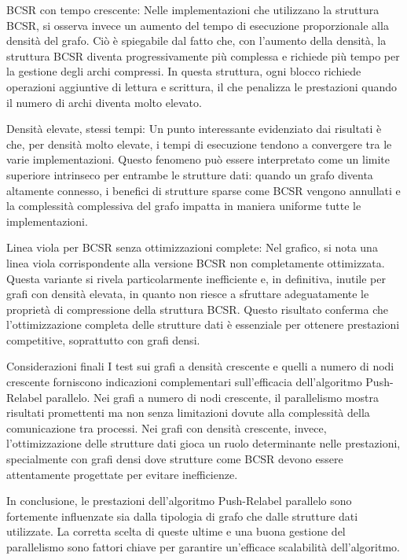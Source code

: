 BCSR con tempo crescente: Nelle implementazioni che utilizzano la struttura BCSR, si osserva invece un aumento del tempo di esecuzione proporzionale alla densità del grafo. Ciò è spiegabile dal fatto che, con l'aumento della densità, la struttura BCSR diventa progressivamente più complessa e richiede più tempo per la gestione degli archi compressi. In questa struttura, ogni blocco richiede operazioni aggiuntive di lettura e scrittura, il che penalizza le prestazioni quando il numero di archi diventa molto elevato.

Densità elevate, stessi tempi: Un punto interessante evidenziato dai risultati è che, per densità molto elevate, i tempi di esecuzione tendono a convergere tra le varie implementazioni. Questo fenomeno può essere interpretato come un limite superiore intrinseco per entrambe le strutture dati: quando un grafo diventa altamente connesso, i benefici di strutture sparse come BCSR vengono annullati e la complessità complessiva del grafo impatta in maniera uniforme tutte le implementazioni.

Linea viola per BCSR senza ottimizzazioni complete: Nel grafico, si nota una linea viola corrispondente alla versione BCSR non completamente ottimizzata. Questa variante si rivela particolarmente inefficiente e, in definitiva, inutile per grafi con densità elevata, in quanto non riesce a sfruttare adeguatamente le proprietà di compressione della struttura BCSR. Questo risultato conferma che l'ottimizzazione completa delle strutture dati è essenziale per ottenere prestazioni competitive, soprattutto con grafi densi.

Considerazioni finali
I test sui grafi a densità crescente e quelli a numero di nodi crescente forniscono indicazioni complementari sull'efficacia dell'algoritmo Push-Relabel parallelo. Nei grafi a numero di nodi crescente, il parallelismo mostra risultati promettenti ma non senza limitazioni dovute alla complessità della comunicazione tra processi. Nei grafi con densità crescente, invece, l'ottimizzazione delle strutture dati gioca un ruolo determinante nelle prestazioni, specialmente con grafi densi dove strutture come BCSR devono essere attentamente progettate per evitare inefficienze.

In conclusione, le prestazioni dell'algoritmo Push-Relabel parallelo sono fortemente influenzate sia dalla tipologia di grafo che dalle strutture dati utilizzate. La corretta scelta di queste ultime e una buona gestione del parallelismo sono fattori chiave per garantire un'efficace scalabilità dell'algoritmo.